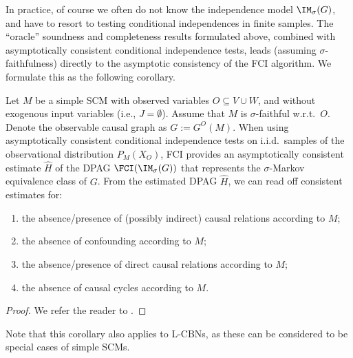 In practice, of course we often do not know the independence model $\IM_\sigma(G)$, and have to resort to testing conditional independences in finite samples.
The ``oracle'' soundness and completeness results formulated above, combined with asymptotically consistent conditional independence tests, leads (assuming $\sigma$-faithfulness) directly to the asymptotic consistency of the FCI algorithm.
We formulate this as the following corollary.
\begin{Cor}
  Let $M$ be a simple SCM with observed variables $O \subseteq V \cup W$, and without exogenous input variables (i.e., $J = \emptyset$).
  Assume that $M$ is $\sigma$-faithful w.r.t.\ $O$.
  Denote the observable causal graph as $G := G^O(M)$.
  When using asymptotically consistent conditional independence tests on i.i.d.\ samples of the observational distribution $P_{M}(X_O)$, FCI provides an asymptotically consistent estimate $\hat{H}$ of the DPAG $\FCI(\IM_\sigma(G))$ that represents the $\sigma$-Markov equivalence class of $G$. From the estimated DPAG $\hat{H}$, we can read off consistent estimates for:
  \begin{enumerate}[label=(\roman*)]
  \item the absence/presence of (possibly indirect) causal relations according to $M$; 
  \item the absence of confounding according to $M$;
  \item the absence/presence of direct causal relations according to $M$;
  \item the absence of causal cycles according to $M$.
  \end{enumerate}
\end{Cor}
\begin{proof}
  We refer the reader to \cite{MooijClaassen_UAI_20}.
\end{proof}
Note that this corollary also applies to L-CBNs, as these can be considered to be special cases of simple SCMs.

